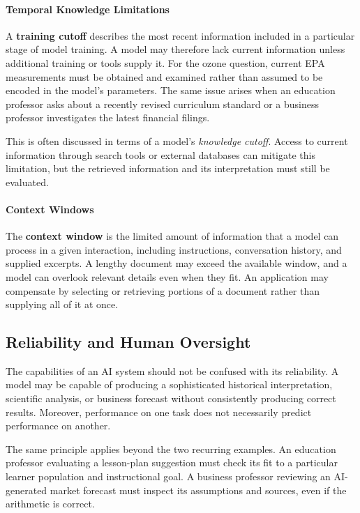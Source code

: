 \documentclass[11pt]{article}
\begin{document}
\paragraph{Temporal Knowledge Limitations}
A \textbf{training cutoff} describes the most recent information
included in a particular stage of model training. A model may therefore
lack current information unless additional training or tools supply it.
For the ozone question, current EPA measurements must be obtained and
examined rather than assumed to be encoded in the model's parameters.
The same issue arises when an education professor asks about a recently
revised curriculum standard or a business professor investigates the
latest financial filings.

This is often discussed in terms of a model's
\emph{knowledge cutoff}. Access to current information
through search tools or external databases can mitigate
this limitation, but the retrieved information and its
interpretation must still be evaluated.

\paragraph{Context Windows}
The \textbf{context window} is the limited amount of information
that a model can process in a given interaction, including instructions,
conversation history, and supplied excerpts. A lengthy document may
exceed the available window, and a model can overlook relevant details
even when they fit. An application may compensate by selecting or
retrieving portions of a document rather than supplying all of it at once.

\subsection{Reliability and Human Oversight}

The capabilities of an AI system should not be confused
with its reliability. A model may be capable of producing
a sophisticated historical interpretation, scientific
analysis, or business forecast without consistently
producing correct results. Moreover, performance on
one task does not necessarily predict performance on
another.

The same principle applies beyond the two recurring examples.
An education professor evaluating a lesson-plan suggestion must check
its fit to a particular learner population and instructional goal.
A business professor reviewing an AI-generated market forecast must
inspect its assumptions and sources, even if the arithmetic is correct.
\end{document}
